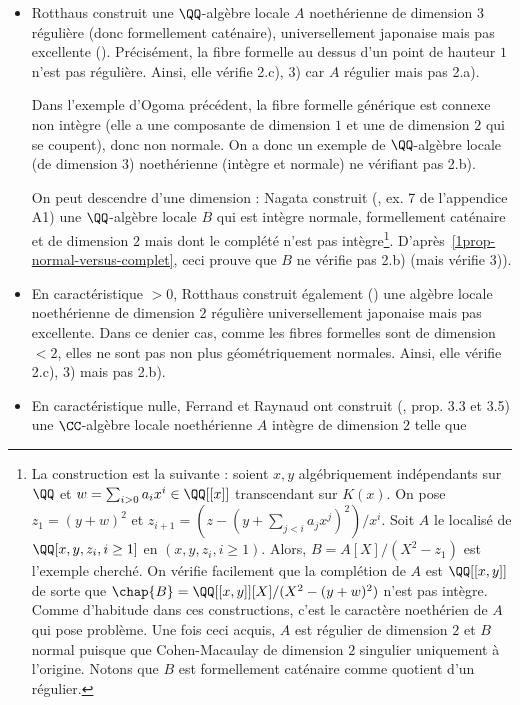 \documentclass[10pt]{../fichiers-configuration-latex/smfart}
\begin{document}
\begin{itemize} \item Rotthaus construit une $\QQ$-algèbre locale $A$ noethérienne de dimension $3$
régulière (donc formellement caténaire), universellement japonaise mais pas excellente
(\cite{Rot79}).  Précisément, la fibre formelle au dessus d'un point de hauteur $1$ n'est pas
régulière. Ainsi, elle vérifie 2.c), 3) car $A$ régulier mais pas 2.a).

Dans l'exemple d'Ogoma précédent, la fibre formelle générique est connexe non intègre (elle a une
composante de dimension $1$ et une de dimension $2$ qui se coupent), donc non normale. On a donc un
exemple de $\QQ$-algèbre locale (de dimension $3$) noethérienne (intègre et normale) ne vérifiant
pas 2.b).

On peut descendre d'une dimension : Nagata construit (\cite{Nag62}, ex. 7 de l'appendice A1) une
$\QQ$-algèbre locale $B$ qui est intègre normale, formellement caténaire et de dimension $2$ mais
dont le complété n'est pas intègre\footnote{La construction est la suivante : soient $x,y$
algébriquement indépendants sur $\QQ$ et $w=\sum_{i>0}a_ix^i\in\QQ[[x]]$ transcendant sur $K(x)$. On
pose $z_1=(y+w)^2$ et $z_{i+1}=(z-(y+\sum_{j<i}a_jx^j)^2)/x^i$. Soit $A$ le localisé de
$\QQ[x,y,z_i,i\geq 1]$ en $(x,y,z_i,i\geq 1)$. Alors, $B=A[X]/(X^2-z_1)$ est l'exemple cherché. On
vérifie facilement que la complétion de $A$ est $\QQ[[x,y]]$ de sorte que $\chap{B}=
\QQ[[x,y]][X]/(X^2-(y+w)^2)$ n'est pas intègre. Comme d'habitude dans ces constructions, c'est le
caractère noethérien de $A$ qui pose problème. Une fois ceci acquis, $A$ est régulier de dimension
$2$ et $B$ normal puisque que Cohen-Macaulay de dimension $2$ singulier uniquement à l'origine.
Notons que $B$ est formellement caténaire comme quotient d'un régulier.}.
D'après~\ref{1prop-normal-versus-complet}, ceci prouve que $B$ ne vérifie pas 2.b) (mais vérifie
3)).

\item En caractéristique $>0$, Rotthaus  construit également (\cite{Rot79}) une algèbre locale
noethérienne de dimension $2$ régulière universellement japonaise mais pas excellente. Dans ce
denier cas, comme les fibres formelles sont de dimension $<2$, elles ne sont pas non plus
géométriquement normales. Ainsi, elle vérifie 2.c), 3)  mais pas 2.b).

\item En caractéristique nulle, Ferrand et Raynaud ont construit (\cite{Fer-Ray70}, prop. 3.3 et 3.5)
une $\CC$-algèbre locale noethérienne $A$ intègre de dimension $2$ telle que


\end{itemize}
\end{document}
